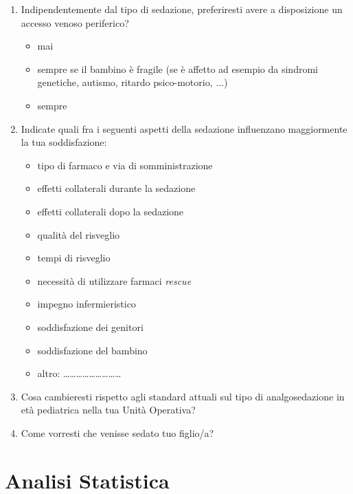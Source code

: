 \begin{enumerate}
           \item Indipendentemente dal tipo di sedazione, preferiresti avere a disposizione un accesso venoso periferico?
           \begin{itemize}
               \item mai
               \item sempre se il bambino è fragile (se è affetto ad esempio da sindromi genetiche, autismo, ritardo psico-motorio, ...)
               \item sempre
           \end{itemize}
\newpage
           \item Indicate quali fra i seguenti aspetti della sedazione influenzano maggiormente la tua soddisfazione:
           \begin{itemize}
                \item tipo di farmaco e via di somministrazione
                \item effetti collaterali durante la sedazione
                \item effetti collaterali dopo la sedazione
                \item qualità del risveglio
                \item tempi di risveglio
                \item necessità di utilizzare farmaci \emph{rescue}
                \item impegno infermieristico
                \item soddisfazione dei genitori
                \item soddisfazione del bambino
                \item altro: ………………………

           \end{itemize}
           \item Cosa cambieresti rispetto agli standard attuali sul tipo di analgosedazione in età pediatrica nella tua Unità Operativa?
           
           \item Come vorresti che venisse sedato tuo figlio/a?
           
           

\end{enumerate}


\section{Analisi Statistica}

